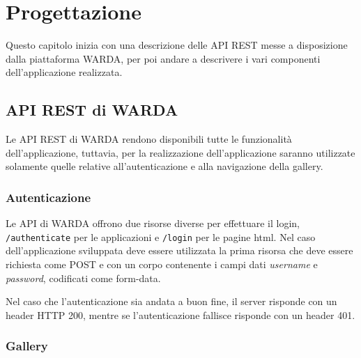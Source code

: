 
\chapter{Progettazione}
\label{cap:progettazione}


Questo capitolo inizia con una descrizione delle API REST messe a disposizione dalla piattaforma WARDA, per poi andare a descrivere i vari componenti dell'applicazione realizzata.


\section{API REST di WARDA}

Le API REST di WARDA rendono disponibili tutte le funzionalità dell'applicazione, tuttavia, per la realizzazione dell'applicazione saranno utilizzate solamente quelle relative all'autenticazione e alla navigazione della gallery.

\subsection{Autenticazione}

Le API di WARDA offrono due risorse diverse per effettuare il login, \texttt{/authenticate} per le applicazioni e \texttt{/login} per le pagine html.
Nel caso dell'applicazione sviluppata deve essere utilizzata la prima risorsa che deve essere richiesta come POST e con un corpo contenente i campi dati \textit{username} e \textit{password}, codificati come form-data.

Nel caso che l'autenticazione sia andata a buon fine, il server risponde con un header HTTP 200, mentre se l'autenticazione fallisce risponde con un header 401.

\subsection{Gallery}

